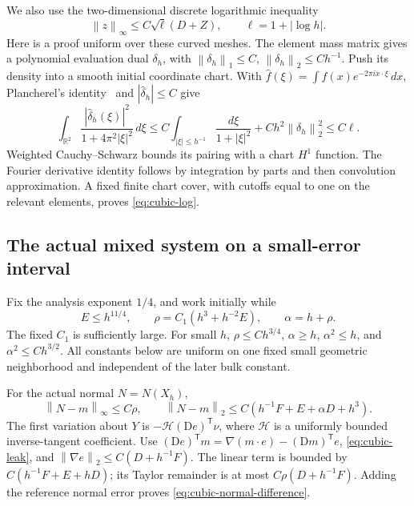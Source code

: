 \documentclass[11pt,a4paper]{article}
\numberwithin{equation}{section}
\theoremstyle{remark}
\newcommand{\R}{\mathbb R}
\newcommand{\norm}[1]{\left\lVert #1\right\rVert}
\begin{document}
We also use the two-dimensional discrete logarithmic inequality
\begin{equation}\label{eq:cubic-log}
 \norm z_\infty\leq C\sqrt\ell(D+Z),\qquad\ell=1+|\log h|.
\end{equation}
Here is a proof uniform over these curved meshes. The element mass
matrix gives a polynomial evaluation dual \(\delta_h\), with
\(\norm{\delta_h}_1\leq C\), \(\norm{\delta_h}_2\leq Ch^{-1}\).
Push its density into a smooth initial coordinate chart. With
\(\widehat f(\xi)=\int f(x)e^{-2\pi i x\cdot\xi}\,dx\), Plancherel's
identity~\cite[Theorem~43]{TaoFourier} and \(|\widehat\delta_h|\leq C\)
give
\[
 \int_{\R^2}\frac{|\widehat\delta_h(\xi)|^2}{1+4\pi^2|\xi|^2}\,d\xi
 \leq C\int_{|\xi|\leq h^{-1}}\frac{d\xi}{1+|\xi|^2}
             +Ch^2\norm{\delta_h}_2^2\leq C\ell.
\]
Weighted Cauchy--Schwarz bounds its pairing with a chart \(H^1\)
function. The Fourier derivative identity follows by integration by
parts and then convolution approximation. A fixed finite chart cover,
with cutoffs equal to one on the relevant elements, proves
\eqref{eq:cubic-log}.

\subsection{The actual mixed system on a small-error interval}

Fix the analysis exponent \(1/4\), and work initially while
\begin{equation}\label{eq:cubic-first-bootstrap}
 E\leq h^{11/4},\qquad
 \rho=C_1(h^3+h^{-2}E),\qquad\alpha=h+\rho .
\end{equation}
The fixed \(C_1\) is sufficiently large. For small \(h\),
\(\rho\leq Ch^{3/4}\), \(\alpha\geq h\),
\(\alpha^2\leq h\), and \(\alpha^2\leq Ch^{3/2}\).
All constants below are uniform on one fixed small geometric
neighborhood and independent of the later bulk constant.

For the actual normal \(N=N(X_h)\),
\begin{equation}\label{eq:cubic-normal-difference}
 \norm{N-m}_\infty\leq C\rho,\qquad
 \norm{N-m}_2\leq C(h^{-1}F+E+\alpha D+h^3).
\end{equation}
The first variation about \(Y\) is \(-\mathcal H(\mathrm De)^{\mathsf T}\nu\),
where \(\mathcal H\) is a uniformly bounded inverse-tangent coefficient.
Use
\((\mathrm De)^{\mathsf T}m=\nabla(m\cdot e)-(\mathrm Dm)^{\mathsf T}e\),
\eqref{eq:cubic-leak}, and
\(\norm{\nabla e}_2\leq C(D+h^{-1}F)\).
The linear term is bounded by \(C(h^{-1}F+E+hD)\); its Taylor remainder
is at most \(C\rho(D+h^{-1}F)\). Adding the reference normal error
proves \eqref{eq:cubic-normal-difference}.
\end{document}
